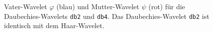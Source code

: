 \begin{figure}
\centering
{}
\caption{Vater-Wavelet $\varphi$ (blau) und Mutter-Wavelet $\psi$
(rot) für die Daubechies-Wavelets \texttt{db2} und \texttt{db4}.
Das Daubechies-Wavelet \texttt{db2} ist identisch mit dem Haar-Wavelet.
\label{buch:algo:db1}}
\end{figure}%
